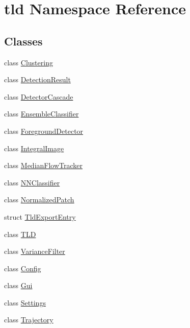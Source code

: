 \hypertarget{namespacetld}{
\section{tld Namespace Reference}
\label{namespacetld}
}
\subsection*{Classes}
\begin{DoxyCompactItemize}
\item 
class \hyperlink{classtld_1_1_clustering}{Clustering}
\item 
class \hyperlink{classtld_1_1_detection_result}{DetectionResult}
\item 
class \hyperlink{classtld_1_1_detector_cascade}{DetectorCascade}
\item 
class \hyperlink{classtld_1_1_ensemble_classifier}{EnsembleClassifier}
\item 
class \hyperlink{classtld_1_1_foreground_detector}{ForegroundDetector}
\item 
class \hyperlink{classtld_1_1_integral_image}{IntegralImage}
\item 
class \hyperlink{classtld_1_1_median_flow_tracker}{MedianFlowTracker}
\item 
class \hyperlink{classtld_1_1_n_n_classifier}{NNClassifier}
\item 
class \hyperlink{classtld_1_1_normalized_patch}{NormalizedPatch}
\item 
struct \hyperlink{structtld_1_1_tld_export_entry}{TldExportEntry}
\item 
class \hyperlink{classtld_1_1_t_l_d}{TLD}
\item 
class \hyperlink{classtld_1_1_variance_filter}{VarianceFilter}
\item 
class \hyperlink{classtld_1_1_config}{Config}
\item 
class \hyperlink{classtld_1_1_gui}{Gui}
\item 
class \hyperlink{classtld_1_1_settings}{Settings}
\item 
class \hyperlink{classtld_1_1_trajectory}{Trajectory}
\end{DoxyCompactItemize}
